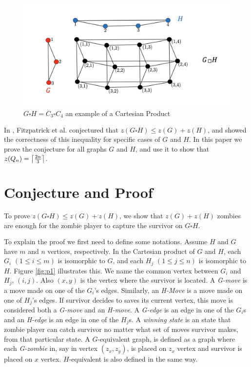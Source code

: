 \documentclass[1p]{elsarticle}
\DeclarePairedDelimiter\ceil{\lceil}{\rceil} \DeclarePairedDelimiter\floor{\lfloor}{\rfloor}
\begin{document}
\begin{figure}[h!]
	\centering
	\includegraphics[width=0.9\linewidth]{fig/CpWest.png}
	\caption{$G \square H = C_3 \square C_4$ an example of a Cartesian Product}
	\label{fig:p2}
\end{figure}

In \cite{Fitz16}, Fitzpatrick et al. conjectured that $z(G \square H) \leq z(G) + z(H)$, and showed the correctness of
this inequality for specific cases of $G$ and $H$. In this paper we prove the conjecture for all graphs $G$ and $H$, and
use it to show that $z(Q_n) =  \ceil*{\frac{2n}{3}}$. 





\section{Conjecture and Proof}\label{conj-proof}

To prove $z(G \square H) \leq z(G) + z(H)$, we show that $z(G) + z(H)$ zombies are enough for the zombie player to
capture the survivor on $G \square H$.

To explain the proof we first need to define some notations. Assume $H$ and $G$ have $m$ and $n$ vertices, respectively.
In the Cartesian product of $G$ and $H$, each $G_{i}$  $(1 \leq i \leq m)$ is isomorphic to $G$, and each $H_{j}$ $(1
\leq j \leq n)$ is isomorphic to $H$. Figure \ref{fig:p1} illustrates this. We name the common vertex between $G_{i}$
and $H_{j}$, $(i,j)$. Also $(x,y)$ is the vertex where the survivor is located. A {\it G-move} is a move made on one of
the $G_{i}$'s edges.  Similarly, an {\it H-Move} is a move made on one of $H_{j}$'s edges. If survivor decides to saves
its current vertex, this move is considered both a {\it G-move} and an {\it H-move}. A {\it G-edge} is an edge in one of
the $G_{i}$s and an {\it H-edge} is an edge in one of the $H_{j}$s. A {\it winning state} is an state that zombie player
can catch survivor no matter what set of moves survivor makes, from that particular state. A $G$-equivalent graph, is
defined as a graph where each {\it G-zombie} in, say in vertex $(z_x,z_y)$, is placed on $z_x$ vertex and survivor is placed on
$x$ vertex. $H$-equivalent is also defined in the same way.
\end{document}
